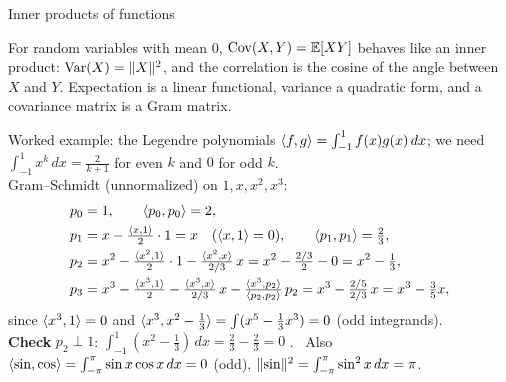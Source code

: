 \documentclass[aspectratio=1610,11pt]{beamer}
\begin{document}
\begin{frame}{Inner products of functions}
    \begin{remark}
        \small For random variables with mean $0$, $\operatorname{Cov}(X, Y) = \mathbb{E}[XY]$ behaves like an inner product: $\operatorname{Var}(X) = \lVert X \rVert^2$, and the correlation is the cosine of the angle between $X$ and $Y$. Expectation is a linear functional, variance a quadratic form, and a covariance matrix is a Gram matrix.
    \end{remark}
\end{frame}

\begin{frame}{Worked example: the Legendre polynomials}
    \small
    $\langle f, g \rangle = \int_{-1}^1f(x)g(x)\,dx$; we need $\int_{-1}^1x^k\,dx = \frac{2}{k + 1}$ for even $k$ and $0$ for odd $k$.
    \\[0.3em]
    Gram--Schmidt (unnormalized) on $1, x, x^2, x^3$:
    \[\begin{aligned}
        p_0 &= 1, \qquad \langle p_0, p_0 \rangle = 2,\\
        p_1 &= x - \tfrac{\langle x, 1 \rangle}{2}\cdot 1 = x \quad (\langle x, 1 \rangle = 0), \qquad \langle p_1, p_1 \rangle = \tfrac{2}{3},\\
        p_2 &= x^2 - \tfrac{\langle x^2, 1 \rangle}{2}\cdot 1 - \tfrac{\langle x^2, x \rangle}{2/3}\,x = x^2 - \tfrac{2/3}{2} - 0 = x^2 - \tfrac{1}{3}, \\
        p_3 &= x^3 - \tfrac{\langle x^3, 1 \rangle}{2} - \tfrac{\langle x^3, x \rangle}{2/3}\,x - \tfrac{\langle x^3, p_2 \rangle}{\langle p_2, p_2 \rangle}\,p_2 = x^3 - \tfrac{2/5}{2/3}\,x = x^3 - \tfrac{3}{5}x,
    \end{aligned}\]
    since $\langle x^3, 1 \rangle = 0$ and $\langle x^3, x^2 - \frac{1}{3} \rangle = \int(x^5 - \frac{1}{3}x^3) = 0$ (odd integrands).
    \\[0.3em]
    \textbf{Check} $p_2 \perp 1$: $\int_{-1}^1(x^2 - \frac{1}{3})\,dx = \frac{2}{3} - \frac{2}{3} = 0$ \checkmark. \ Also $\langle \sin, \cos \rangle = \int_{-\pi}^\pi\sin x\cos x\,dx = 0$ (odd), $\lVert \sin \rVert^2 = \int_{-\pi}^\pi\sin^2x\,dx = \pi$.
\end{frame}
\end{document}
